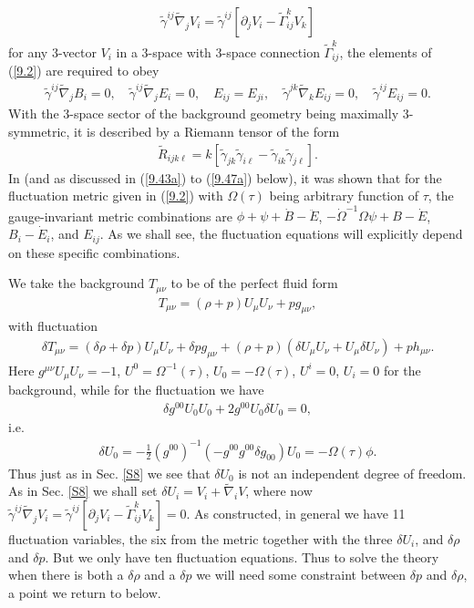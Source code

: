 %
\begin{eqnarray}
\tilde{\gamma}^{ij}\tilde{\nabla}_j V_i=\tilde{\gamma}^{ij}[\partial_j V_i-\tilde{\Gamma}^{k}_{ij}V_k]
\label{9.3}
\end{eqnarray}
%
for any 3-vector $V_i$ in a 3-space with 3-space connection $\tilde{\Gamma}^{k}_{ij}$, the elements of (\ref{9.2}) are required to obey
%
\begin{eqnarray}
\tilde{\gamma}^{ij}\tilde{\nabla}_j B_i = 0,\quad \tilde{\gamma}^{ij}\tilde{\nabla}_j E_i = 0, \quad E_{ij}=E_{ji},\quad \tilde{\gamma}^{jk}\tilde{\nabla}_kE_{ij} = 0, \quad\tilde{\gamma}^{ij}E_{ij} = 0.
\label{9.4}
\end{eqnarray}
%
With the  3-space sector of the background geometry being maximally 3-symmetric, it is described by a Riemann tensor of the form
%
\begin{eqnarray}
\tilde{R}_{ijk\ell}=k[\tilde{\gamma}_{jk}\tilde{\gamma}_{i\ell}-\tilde{\gamma}_{ik}\tilde{\gamma}_{j\ell}].
\label{9.5}
\end{eqnarray}
%
In \cite{amarasinghe_2019} (and as discussed in (\ref{9.43a}) to (\ref{9.47a}) below), it was shown that for the fluctuation metric given in (\ref{9.2}) with $\Omega(\tau)$ being arbitrary function of $\tau$, the gauge-invariant metric combinations are $\phi + \psi + \dot B - \ddot E$, $ - \dot\Omega^{-1}\Omega \psi + B - \dot E$, $B_i-\dot{E}_i$, and $E_{ij}$. As we shall see, the fluctuation equations will explicitly depend on these specific combinations.



We take the background $T_{\mu\nu}$ to be of the perfect fluid form
%
\begin{eqnarray}
T_{\mu\nu}=(\rho+p)U_{\mu}U_{\nu}+pg_{\mu\nu},
\label{9.6}
\end{eqnarray}
%
with fluctuation
%
\begin{eqnarray}
\delta T_{\mu\nu}=(\delta\rho+\delta p)U_{\mu}U_{\nu}+\delta pg_{\mu\nu}+(\rho+p)(\delta U_{\mu}U_{\nu}+U_{\mu}\delta U_{\nu})+ph_{\mu\nu}.
\label{9.7}
\end{eqnarray}
%
Here  $g^{\mu\nu}U_{\mu}U_{\nu}=-1$, $U^{0}=\Omega^{-1}(\tau)$, $U_0=-\Omega(\tau)$, $U^{i}=0$, $U_i=0$ for the background, while for the fluctuation we have 
%
\begin{eqnarray}
\delta g^{00}U_{0}U_{0}+2g^{00}U_{0}\delta U_{0}=0,
\label{9.8}
\end{eqnarray}
%
i.e. 
%
\begin{eqnarray}
\delta U_{0}=-\frac{1}{2}(g^{00})^{-1}(-g^{00}g^{00}\delta g_{00})U_{0}=-\Omega(\tau)\phi.
\label{9.9}
\end{eqnarray}
%
Thus just as in Sec. \ref{S8} we see that $\delta U_0$ is not an independent degree of freedom. As in Sec. \ref{S8} we shall set $\delta U_i=V_i+\tilde{\nabla}_iV$, where now $\tilde{\gamma}^{ij}\tilde{\nabla}_j V_i=\tilde{\gamma}^{ij}[\partial_j V_i-\tilde{\Gamma}^{k}_{ij}V_k]=0$. As constructed, in general we have 11 fluctuation variables, the six from the metric together with the three $\delta U_i$, and $\delta\rho$ and $\delta p$. But we only have ten fluctuation equations. Thus to solve the theory when there is both a $\delta \rho$ and a $\delta p$ we will need some constraint between $\delta p$ and $\delta \rho$, a point we return to below.

